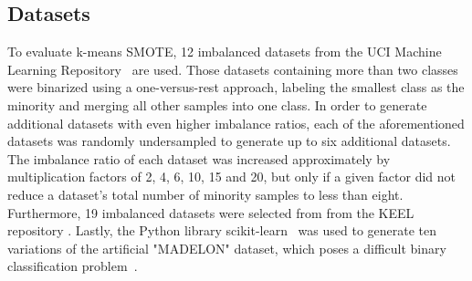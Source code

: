 \documentclass[sort&compress]{elsarticle}
\begin{document}
	\subsection{Datasets}
    \label{sec:datasets}
	To evaluate k-means \ac{SMOTE}, 12 imbalanced datasets from the UCI Machine
	Learning Repository~\citep{Lichman.2013} are used. Those datasets containing
	more than two classes were binarized using a one-versus-rest approach,
	labeling the smallest class as the minority and merging all other samples
	into one class. In order to generate additional datasets with even higher
	imbalance ratios, each of the aforementioned datasets was randomly
	undersampled to generate up to six additional datasets. The imbalance ratio
	of each dataset was increased approximately by multiplication factors of 2,
	4, 6, 10, 15 and 20, but only if a given factor did not reduce a dataset's
	total number of minority samples to less than eight. Furthermore, 19
	imbalanced datasets were selected from from the KEEL repository
	\cite{Alcala-fdez.2011}. Lastly, the Python library
	scikit-learn~\citep{Pedregosa.2011} was used to generate ten variations of
	the artificial "MADELON" dataset, which poses a difficult binary
	classification problem~\citep{Guyon.2003}.
\end{document}
